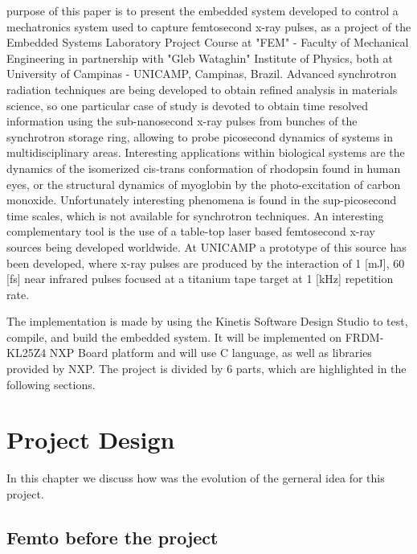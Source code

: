 \documentclass[journal]{IEEEtran}
\begin{document}
 purpose of this paper is to present the embedded system developed to control a mechatronics system used to capture femtosecond x-ray pulses, as a project of the Embedded Systems Laboratory Project Course \cite{IEEEhowto:denis} at "FEM" - Faculty of Mechanical Engineering in partnership with "Gleb Wataghin" Institute of Physics, both at University of Campinas - UNICAMP, Campinas, Brazil. Advanced synchrotron radiation techniques are being developed to obtain refined analysis in materials science, so one particular case of study is devoted to obtain time resolved information using the sub-nanosecond x-ray pulses from bunches of the synchrotron storage ring, allowing to probe picosecond dynamics of systems in multidisciplinary areas. Interesting applications within biological systems are the dynamics of the isomerized cis-trans conformation of rhodopsin found in human eyes, or the structural dynamics of myoglobin by the photo-excitation of carbon monoxide. Unfortunately interesting phenomena is found in the sup-picosecond time scales, which is not available for synchrotron techniques. An interesting complementary tool is the use of a table-top laser based femtosecond x-ray sources being developed worldwide. At UNICAMP a prototype of this source has been developed, where x-ray pulses are produced by the interaction of 1 [mJ], 60 [fs] near infrared pulses focused at a titanium tape target at 1 [kHz] repetition rate.

The implementation is made by using the Kinetis Software Design Studio \cite{IEEEhowto:Kinetis} to test, compile, and build the embedded system. It will be implemented on FRDM-KL25Z4 NXP Board platform \cite{IEEEhowto:FRDM-KL25Z4} and will use C language, as well as libraries provided by NXP. The project is divided by 6 parts, which are highlighted in the following sections.

\section{Project Design}

In this chapter we discuss how was the evolution of the gerneral idea for this project.

\subsection{Femto before the project}

\end{document}
